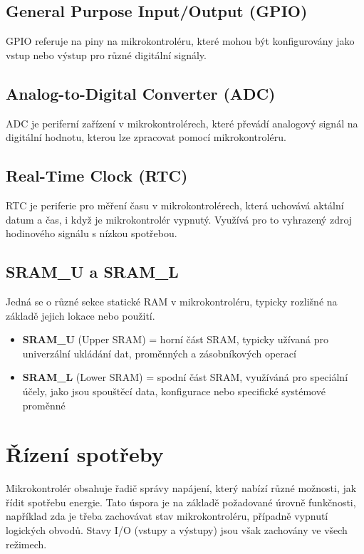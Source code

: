 \documentclass{article}
\begin{document}
\subsection{General Purpose Input/Output (GPIO)}

GPIO referuje na piny na mikrokontroléru, které mohou být konfigurovány jako
vstup nebo výstup pro různé digitální signály.

\subsection{Analog-to-Digital Converter (ADC)}

ADC je periferní zařízení v mikrokontrolérech, které převádí analogový signál
na digitální hodnotu, kterou lze zpracovat pomocí mikrokontroléru.

\subsection{Real-Time Clock (RTC)}

RTC je periferie pro měření času v mikrokontrolérech, která uchovává aktální
datum a čas, i když je mikrokontrolér vypnutý. Využívá pro to vyhrazený zdroj
hodinového signálu s nízkou spotřebou.

\subsection{SRAM\_U a SRAM\_L}

Jedná se o různé sekce statické RAM v mikrokontroléru, typicky rozlišné na
základě jejich lokace nebo použití.
\begin{itemize}
    \item \textbf{SRAM\_U} (Upper SRAM) = horní část SRAM, typicky užívaná pro
        univerzální ukládání dat, proměnných a zásobníkových operací
    \item \textbf{SRAM\_L} (Lower SRAM) = spodní část SRAM, využíváná pro
        speciální účely, jako jsou spouštěcí data, konfigurace nebo specifické
        systémové proměnné
\end{itemize}

\section{Řízení spotřeby}

Mikrokontrolér obsahuje řadič správy napájení, který nabízí různé možnosti, jak
řídit spotřebu energie. Tato úspora je na základě požadované úrovně funkčnosti,
například zda je třeba zachovávat stav mikrokontroléru, případně vypnutí
logických obvodů. Stavy I/O (vstupy a výstupy) jsou však zachovány ve všech
režimech.
\end{document}
